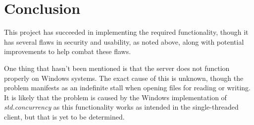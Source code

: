 \documentclass[a4paper]{article}
\begin{document}
\section{Conclusion}

This project has succeeded in implementing the required functionality, though it has several flaws in security and usability, as noted above, along with potential improvements to help combat these flaws.

One thing that hasn't been mentioned is that the server does not function properly on Windows systems. The exact cause of this is unknown, though the problem manifests as an indefinite stall when opening files for reading or writing. It is likely that the problem is caused by the Windows implementation of \textit{std.concurrency} as this functionality works as intended in the single-threaded client, but that is yet to be determined.


\printbibliography
\end{document}
